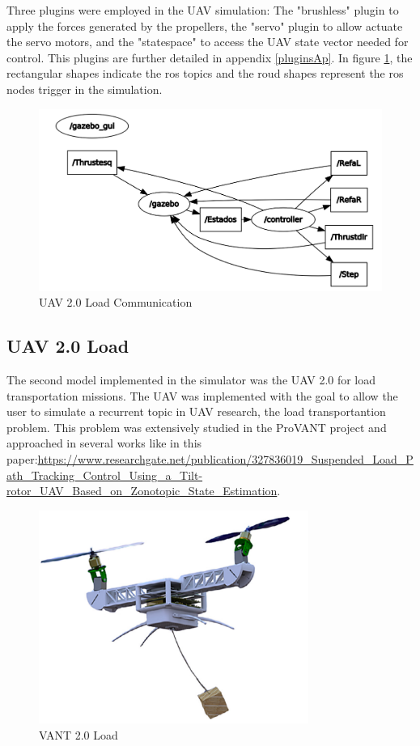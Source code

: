 Three plugins were employed in the UAV simulation: The "brushless" plugin to apply the forces generated by the propellers, the "servo" plugin to allow actuate the servo motors, and the "statespace" to access the UAV state vector needed for control. This plugins are further detailed in appendix \ref{pluginsAp}. In figure \ref{v2graph}, the rectangular shapes indicate the ros topics and the roud shapes represent the ros nodes trigger in the simulation.

\begin{figure}[!ht]
	\centering
	\includegraphics[width=350pt]{figuras/v2graph.png}
	\caption{UAV 2.0 Load Communication}
	\label{v2graph}
\end{figure}

\subsection{UAV 2.0 Load}


The second model implemented in the simulator was the UAV 2.0 for load transportation missions. The UAV was implemented with the goal to allow the user to simulate a recurrent topic in UAV research, the load transportantion problem. This problem was extensively studied in the ProVANT project and approached in several works like in this paper:\url{https://www.researchgate.net/publication/327836019_Suspended_Load_Path_Tracking_Control_Using_a_Tilt-rotor_UAV_Based_on_Zonotopic_State_Estimation}.

\begin{figure}[!ht]
	\centering
	\includegraphics[width=250pt]{figuras/vant2load.png}
	\caption{VANT 2.0 Load}
	\label{vant2load}
\end{figure}

